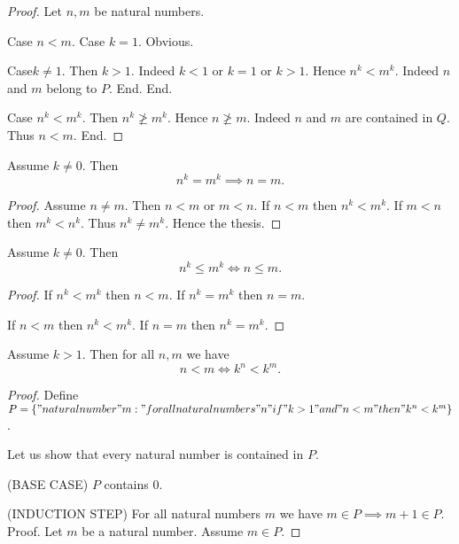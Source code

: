 \documentclass[../../natural-numbers.ftl.tex]{subfiles}
\begin{document}
\begin{forthel}
\begin{proof}
      Let $n,m$ be natural numbers.

      Case $n < m$.
        Case $k = 1$. Obvious.

        Case$k \neq 1$.
          Then $k > 1$.
          Indeed $k < 1$ or $k = 1$ or $k > 1$.
          Hence $n^{k} < m^{k}$.
          Indeed $n$ and $m$ belong to $P$.
        End.
      End.

      Case $n^{k} < m^{k}$.
        Then $n^{k} \ngeq m^{k}$.
        Hence $n \ngeq m$.
        Indeed $n$ and $m$ are contained in $Q$.
        Thus $n < m$.
      End.
    \end{proof}


    \begin{corollary}[NN 02 04 537812]
      Assume $k \neq 0$.
      Then
      $$n^{k} = m^{k} \implies n = m.$$
    \end{corollary}
    \begin{proof}
      Assume $n \neq m$.
      Then $n < m$ or $m < n$.
      If $n < m$ then $n^{k} < m^{k}$.
      If $m < n$ then $m^{k} < n^{k}$.
      Thus $n^{k} \neq m^{k}$.
      Hence the thesis.
    \end{proof}


    \begin{corollary}[NN 02 04 707319]
      Assume $k \neq 0$.
      Then
      $$n^{k} \leq m^{k} \iff n \leq m.$$
    \end{corollary}
    \begin{proof}
      If $n^{k} < m^{k}$ then $n < m$.
      If $n^{k} = m^{k}$ then $n = m$.

      If $n < m$ then $n^{k} < m^{k}$.
      If $n = m$ then $n^{k} = m^{k}$.
    \end{proof}


    \begin{proposition}[NN 02 04 274623]
      Assume $k > 1$.
      Then for all $n,m$ we have
      $$n < m \iff k^{n} < k^{m}.$$
    \end{proposition}
    \begin{proof}
      Define $P = \{ "natural number" m : " for all natural numbers" n "if" k > 1 "and" n < m "then" k^{n} < k^{m} \}$.

      Let us show that every natural number is contained in $P$.

        (BASE CASE) $P$ contains $0$.

        (INDUCTION STEP) For all natural numbers $m$ we have $m \in P \implies m + 1 \in P$. \\
        Proof.
          Let $m$ be a natural number.
          Assume $m \in P$.


\end{proof}
\end{forthel}
\end{document}
